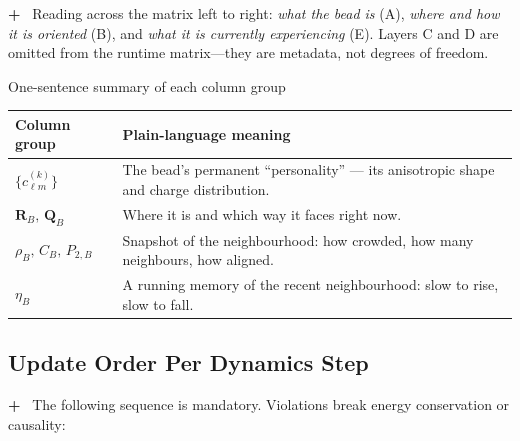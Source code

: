 \documentclass[11pt]{article}
\newcommand{\vsadd}[1]{\textcolor{vsgreen}{\textbf{+}~#1}}
\begin{document}
\noindent
\vsadd{%
Reading across the matrix left to right: \emph{what the bead is} (A),
\emph{where and how it is oriented} (B), and \emph{what it is currently
experiencing} (E).  Layers C and D are omitted from the runtime matrix---they
are metadata, not degrees of freedom.
}

\medskip
\noindent
\begin{rulebox}{One-sentence summary of each column group}
\begin{tabularx}{\linewidth}{@{}lX@{}}
  \toprule
  \textbf{Column group} & \textbf{Plain-language meaning} \\
  \midrule
  $\{c_{\ell m}^{(k)}\}$ & The bead's permanent ``personality'' ---
							its anisotropic shape and charge distribution. \\
  $\mathbf{R}_B,\,\mathbf{Q}_B$ & Where it is and which way it faces right now. \\
  $\rho_B,\,C_B,\,P_{2,B}$ & Snapshot of the neighbourhood: how crowded, how
							   many neighbours, how aligned. \\
  $\eta_B$ & A running memory of the recent neighbourhood: slow to rise,
			  slow to fall. \\
  \bottomrule
\end{tabularx}
\end{rulebox}

\subsection*{Update Order Per Dynamics Step}

\vsadd{%
The following sequence is mandatory.  Violations break energy conservation
or causality:
}

\begin{center}
\end{center}
\end{document}
